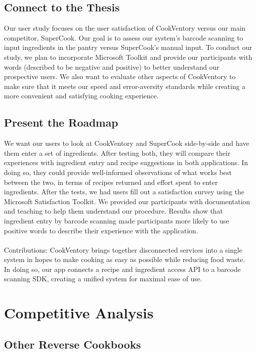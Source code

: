\documentclass{sigchi}
\begin{document}
\subsection{Connect to the Thesis}
	Our user study focuses on the user satisfaction of CookVentory versus our main competitor, SuperCook. Our goal is to assess our system's barcode scanning to input ingredients in the pantry versus SuperCook's manual input. To conduct our study, we plan to incorporate Microsoft Toolkit and provide our participants with words (described to be negative and positive) to better understand our prospective users. We also want to evaluate other aspects of CookVentory to make sure that it meets our speed and error-aversity standards while creating a more convenient and satisfying cooking experience.
    
\subsection{Present the Roadmap}
	We want our users to look at CookVentory and SuperCook side-by-side and have them enter a set of ingredients. After testing both, they will compare their experiences with ingredient entry and recipe suggestions in both applications. In doing so, they could provide well-informed observations of what works best between the two, in terms of recipes returned and effort spent to enter ingredients. After the tests, we had users fill out a satisfaction survey using the Microsoft Satisfaction Toolkit. We provided our participants with documentation and teaching to help them understand our procedure. Results show that ingredient entry by barcode scanning made participants more likely to use positive words to describe their experience with the application.\\~\\
	Contributions: CookVentory brings together disconnected services into a single system in hopes to make cooking as easy as possible while reducing food waste. In doing so, our app connects a recipe and ingredient access API to a barcode scanning SDK, creating a unified system for maximal ease of use.

\section{Competitive Analysis}\label{competition}
\subsection{Other Reverse Cookbooks}\label{ssec:reverse}
\end{document}
